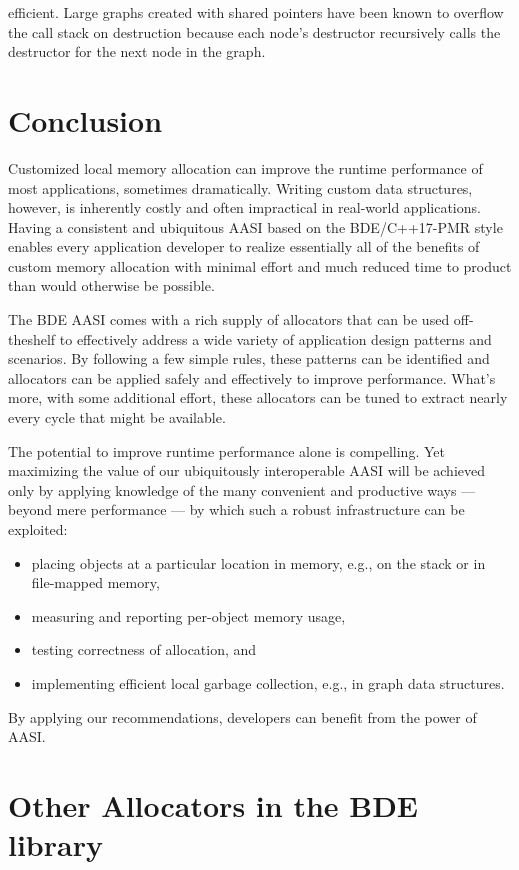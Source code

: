 efficient. Large graphs created with shared pointers have been known to
overflow the call stack on destruction because each node’s destructor
recursively calls the destructor for the next node in the graph.

\section{Conclusion}
Customized local memory allocation can improve the runtime performance of
most applications, sometimes dramatically. Writing custom data structures,
however, is inherently costly and often impractical in real-world applications.
Having a consistent and ubiquitous AASI based on the BDE/C++17-PMR style
enables every application developer to realize essentially all of the benefits of
custom memory allocation with minimal effort and much reduced time to
product than would otherwise be possible.

The BDE AASI comes with a rich supply of allocators that can be used off-theshelf to effectively address a wide variety of application design patterns and
scenarios. By following a few simple rules, these patterns can be identified and
allocators can be applied safely and effectively to improve performance. What’s
more, with some additional effort, these allocators can be tuned to extract
nearly every cycle that might be available.

The potential to improve runtime performance alone is compelling. Yet
maximizing the value of our ubiquitously interoperable AASI will be achieved
only by applying knowledge of the many convenient and productive ways —
beyond mere performance — by which such a robust infrastructure can be
exploited:
\begin{itemize}
\item placing objects at a particular location in memory, e.g., on the stack or in
file-mapped memory,
\item measuring and reporting per-object memory usage,
\item testing correctness of allocation, and
\item implementing efficient local garbage collection, e.g., in graph data
  structures.
\end{itemize}
By applying our recommendations, developers can benefit from the power of
AASI.

\appendix

\section{Other Allocators in the BDE library}


